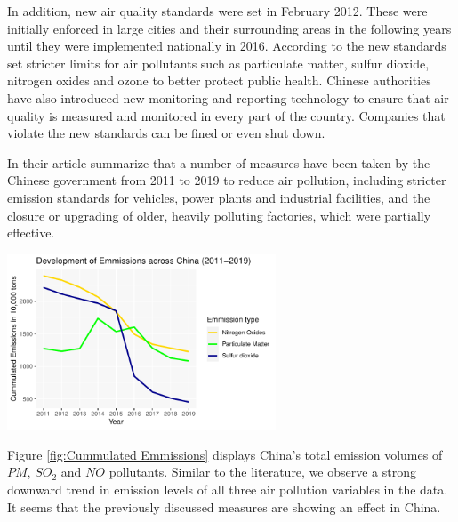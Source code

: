 \documentclass[
]{article}
\begin{document}
	In addition, new air quality standards were set in February 2012. These were initially enforced in large cities and their surrounding areas in the following years until they were implemented nationally in 2016. According to the \cite{Transport2012} new standards set stricter limits for air pollutants such as particulate matter, sulfur dioxide, nitrogen oxides and ozone to better protect public health. Chinese authorities have also introduced new monitoring and reporting technology to ensure that air quality is measured and monitored in every part of the country. Companies that violate the new standards can be fined or even shut down.

	In their article \cite{ijerph13121219} summarize that a number of measures have been taken by the Chinese government from 2011 to 2019 to reduce air pollution, including stricter emission standards for vehicles, power plants and industrial facilities, and the closure or upgrading of older, heavily polluting factories, which were partially effective.

	\begin{center}
	\includegraphics[width=0.6\textwidth]{Development of Emmissions China total.pdf}
	\label{fig:Cummulated Emmissions}
	\end{center}

	Figure \ref{fig:Cummulated Emmissions} displays China's total emission volumes of $PM$, $SO_2$ and $NO$ pollutants. Similar to the literature, we observe a strong downward trend in emission levels of all three air pollution variables in the data. It seems that the previously discussed measures are showing an effect in China.
\end{document}
